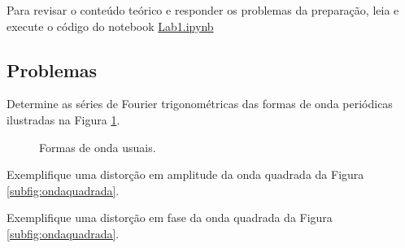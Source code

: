 \documentclass[12pt,addpoints]{exam}
\begin{document}
Para revisar o conteúdo teórico e responder os problemas da preparação, leia e execute o código do notebook \href{https://github.com/edsonportosilva/LPC/blob/master/Jupyter/Lab1/Lab1.ipynb}{Lab1.ipynb}

\subsection{Problemas}

\begin{questions}
    \question Determine as séries de Fourier trigonométricas das formas de onda periódicas ilustradas na Figura \ref{fig:sinaisusuais}.
    \begin{figure}[htb]
        \centering
        \label{subfig:ondaquadrada}
        \qquad
        \qquad
        \caption{Formas de onda usuais.}
        \label{fig:sinaisusuais}
    \end{figure}

    \question Exemplifique uma distorção em amplitude da onda quadrada da Figura \ref{subfig:ondaquadrada}.
    
    \question Exemplifique uma distorção em fase da onda quadrada da Figura \ref{subfig:ondaquadrada}.
  \end{questions}
\end{document}
